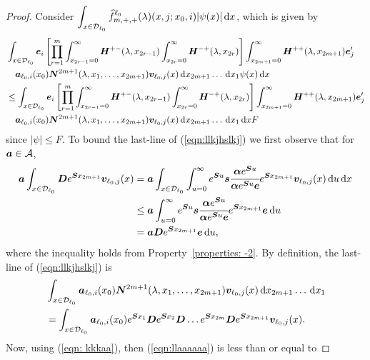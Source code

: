 \begin{proof}
	Consider \(\displaystyle\int_{x\in\mathcal{D}_{\ell_0}}\widehat f^{\ell_0}_{m,+,+}(\lambda)(x,j;x_0,i)|\psi(x)|\, \mathrm{d} x\), which is given by 
        \begin{align}
        	&\int_{x\in\mathcal{D}_{\ell_0}}\boldsymbol e_i \left[\prod_{r=1}^m\int_{x_{2r-1}=0}^\infty \boldsymbol H^{+-}(\lambda,x_{2r-1})\nonumber
			\int_{x_{2r}=0}^\infty \boldsymbol H^{-+}(\lambda,x_{2r}) \right]
			\int_{x_{2m+1}=0}^\infty \boldsymbol H^{++}(\lambda,x_{2m+1}) \boldsymbol e_j'{}
			\\&\quad\boldsymbol a_{\ell_0,i}(x_0) \boldsymbol N^{2m+1}(\lambda,x_1,\dots,x_{2m+1}) {\boldsymbol v}_{\ell_0,j}( x)\, \mathrm{d} x_{2m+1}\dots\, \mathrm{d} x_1 \psi(x)\, \mathrm{d} x\nonumber
			\\&\leq \int_{x\in\mathcal{D}_{\ell_0}}\boldsymbol e_i \left[\prod_{r=1}^m\int_{x_{2r-1}=0}^\infty \boldsymbol H^{+-}(\lambda,x_{2r-1})\nonumber
			\int_{x_{2r}=0}^\infty \boldsymbol H^{-+}(\lambda,x_{2r}) \right]
			\int_{x_{2m+1}=0}^\infty \boldsymbol H^{++}(\lambda,x_{2m+1}) \boldsymbol e_j'{}
			\\&\quad\boldsymbol a_{\ell_0,i}(x_0) \boldsymbol N^{2m+1}(\lambda,x_1,\dots,x_{2m+1}) {\boldsymbol v}_{\ell_0,j}( x)\, \mathrm{d} x_{2m+1}\dots\, \mathrm{d} x_1 \, \mathrm{d} x F 
			\label{eqn:llkjhslkj}
	\end{align}
	since \(|\psi|\leq F\). To bound the last-line of (\ref{eqn:llkjhslkj}) we first observe that for \(\boldsymbol a \in \mathcal A\), 
	\begin{align}
		\boldsymbol a\int_{x\in\mathcal{D}_{\ell_0}}\boldsymbol De^{\boldsymbol Sx_{2m+1}}{\boldsymbol v}_{\ell_0,j}(x) 
		&= \boldsymbol a\int_{x\in\mathcal{D}_{\ell_0}}\int_{u=0}^\infty e^{\boldsymbol Su}\boldsymbol s\cfrac{\boldsymbol \alpha e^{\boldsymbol S u}}{\boldsymbol \alpha e^{\boldsymbol S u}\boldsymbol e}e^{\boldsymbol Sx_{2m+1}}{\boldsymbol v}_{\ell_0,j}(x)\, \mathrm{d} u\, \mathrm{d} x\nonumber
		\\&\leq \boldsymbol a\int_{u=0}^\infty e^{\boldsymbol Su}\boldsymbol s\cfrac{\boldsymbol \alpha e^{\boldsymbol S u}}{\boldsymbol \alpha e^{\boldsymbol S u}\boldsymbol e}e^{\boldsymbol Sx_{2m+1}}{\boldsymbol e}\, \mathrm{d} u\nonumber
		\\&= \boldsymbol a\boldsymbol D e^{\boldsymbol Sx_{2m+1}}{\boldsymbol e}\, \mathrm{d} u, \label{eqn: kkkaa}
	\end{align}
	where the inequality holds from Property~\ref{properties: -2}. By definition, the last-line of (\ref{eqn:llkjhslkj}) is 
	\begin{align}
		&\int_{x\in\mathcal{D}_{\ell_0}} \boldsymbol a_{\ell_0,i}(x_0) \boldsymbol N^{2m+1}(\lambda,x_1,\dots,x_{2m+1}) {\boldsymbol v}_{\ell_0,j}( x)\, \mathrm{d} x_{2m+1}\dots\, \mathrm{d} x_1\nonumber
		\\&=\int_{x\in\mathcal{D}_{\ell_0}}\boldsymbol a_{\ell_0,i}(x_0)e^{\boldsymbol{S}x_1} \boldsymbol{D}e^{\boldsymbol{S}x_2} \boldsymbol{D}\dots e^{\boldsymbol{S}x_{2m}} \boldsymbol{D}e^{\boldsymbol{S}x_{2m+1}}{\boldsymbol v}_{\ell_0,j}(x).\label{eqn:llaaaaaa}
	\end{align}
	Now, using (\ref{eqn: kkkaa}), then (\ref{eqn:llaaaaaa}) is less than or equal to 

\end{proof}
